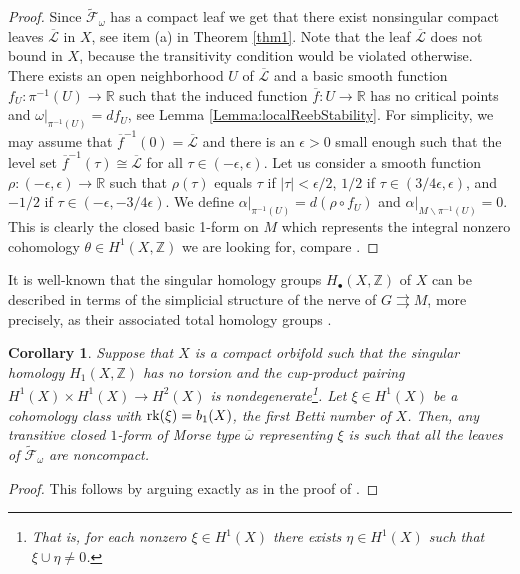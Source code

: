 \documentclass[
  a4paper, 
  reqno, 
  oneside, 
  12pt
]{amsart}
\newtheorem{corollary}[theorem]{Corollary}
\theoremstyle{definition}
\theoremstyle{remark}
\newcommand{\rr}{\rightrightarrows}
\begin{document}
\begin{proof}
Since $\tilde{\mathcal{F}}_\omega$ has a compact leaf we get that there exist nonsingular compact leaves $\overline{\mathcal{L}}$ in $X$, see item (a) in Theorem \ref{thm1}. Note that the leaf $\overline{\mathcal{L}}$ does not bound in $X$, because the transitivity condition would be violated otherwise. There exists an open neighborhood $U$ of $\overline{\mathcal{L}}$ and a basic smooth function $f_U:\pi^{-1}(U)\to \mathbb{R}$ such that the induced function $\overline{f}:U\to \mathbb{R}$ has no critical points and $\omega|_{\pi^{-1}(U)}=df_U$, see Lemma \ref{Lemma:localReebStability}. For simplicity, we may assume that $\overline{f}^{-1}(0)=\overline{\mathcal{L}}$ and there is an $\epsilon>0$ small enough such that the level set $\overline{f}^{-1}(\tau)\cong \overline{\mathcal{L}}$ for all $\tau \in (-\epsilon,\epsilon)$. Let us consider a smooth function $\rho:(-\epsilon,\epsilon)\to \mathbb{R}$ such that $\rho(\tau)$ equals $\tau$ if $\vert \tau \vert <\epsilon/2$, $1/2$ if $\tau\in (3/4\epsilon,\epsilon)$, and $-1/2$ if $\tau\in (-\epsilon,-3/4\epsilon)$. We define $\alpha|_{\pi^{-1}(U)}=d(\rho\circ f_U)$ and $\alpha|_{M\backslash \pi^{-1}(U)}=0$.  This is clearly the closed basic 1-form on $M$ which represents the integral nonzero cohomology $\theta\in H^1(X,\mathbb{Z})$ we are looking for, compare \cite[Prop. 9.14]{F}.
\end{proof}

It is well-known that the singular homology groups $H_\bullet(X,\mathbb{Z})$ of $X$ can be described in terms of the simplicial structure of the nerve of $G\rr M$, more precisely, as their associated total homology groups \cite{Be}. 

\begin{corollary}\label{cor2}
Suppose that $X$ is a compact orbifold such that the singular homology $H_1(X,\mathbb{Z})$ has no torsion and the cup-product pairing $H^1(X)\times H^1(X)\to H^2(X)$ is nondegenerate\footnote{That is, for each nonzero $\xi\in H^1(X)$ there exists $\eta\in H^1(X)$ such that $\xi \cup \eta\neq 0$.}. Let $\xi \in H^1(X)$ be a cohomology class with $\textnormal{rk}(\xi)=b_1(X)$, the first Betti number of $X$. Then, any transitive closed $1$-form of Morse type $\overline{\omega}$ representing $\xi$ is such that all the leaves of $\tilde{\mathcal{F}}_\omega$ are noncompact. 
\end{corollary}
\begin{proof}
This follows by arguing exactly as in the proof of \cite[Thm. 9.15]{F}.
\end{proof}
\end{document}
